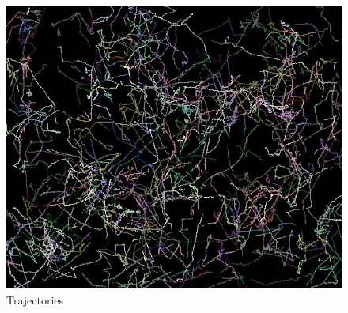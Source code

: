 \documentclass[conference]{IEEEtran}
\begin{document}
    \begin{figure}
      \begin{center}
        \includegraphics[scale=0.5]{./images/result.png}
        \caption{Trajectories}\label{fig:}
        
      \end{center}
    \end{figure}






%
\end{document}
